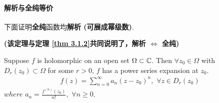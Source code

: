 \paragraph{解析与全纯等价}
	下面证明\textbf{全纯}函数均\textbf{解析 (可展成幂级数)}. 
	\begin{center}
		\textbf{(该定理与定理 \ref{thm 3.1.2}共同说明了，解析 $\Leftrightarrow$ 全纯)}
	\end{center}
	\begin{thm}\label{thm 6.2.2}
		Suppose $f$ is holomorphic on an open set $\Omega \subset \mathbb{C}$. Then $\forall z_0 \in \Omega$ with $D_{r}(z_0) \subset \Omega$ for some $r > 0$, $f$ has a power series expansion at $z_0$.
		\begin{align}
			f(z) = \sum_{n = 0}^{\infty}{a_n (z - z_0)^n} , \,\, \forall z \in D_{r}(z_0)
		\end{align}
		$where \,\, a_n = \frac{f^{(n)}(z_0)}{n!} , \,\, \forall n \geq 0$.\\
		

\end{thm}
